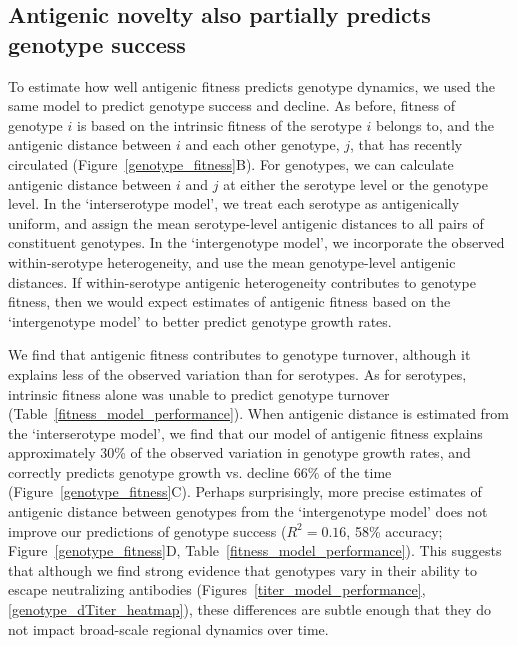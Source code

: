 \documentclass[11pt,oneside,letterpaper]{article}
\begin{document}
\subsection*{Antigenic novelty also partially predicts genotype success}
To estimate how well antigenic fitness predicts genotype dynamics, we used the same model to predict genotype success and decline.
As before, fitness of genotype $i$ is based on the intrinsic fitness of the serotype $i$ belongs to, and the antigenic distance between $i$ and each other genotype, $j$, that has recently circulated (Figure~\ref{genotype_fitness}B).
For genotypes, we can calculate antigenic distance between $i$ and $j$ at either the serotype level or the genotype level.
In the `interserotype model', we treat each serotype as antigenically uniform, and assign the mean serotype-level antigenic distances to all pairs of constituent genotypes.
In the `intergenotype model', we incorporate the observed within-serotype heterogeneity, and use the mean genotype-level antigenic distances.
If within-serotype antigenic heterogeneity contributes to genotype fitness, then we would expect estimates of antigenic fitness based on the `intergenotype model' to better predict genotype growth rates.

We find that antigenic fitness contributes to genotype turnover, although it explains less of the observed variation than for serotypes.
As for serotypes, intrinsic fitness alone was unable to predict genotype turnover (Table~\ref{fitness_model_performance}).
When antigenic distance is estimated from the `interserotype model', we find that our model of antigenic fitness explains approximately 30\% of the observed variation in genotype growth rates, and correctly predicts genotype growth vs. decline 66\% of the time (Figure~\ref{genotype_fitness}C).
Perhaps surprisingly, more precise estimates of antigenic distance between genotypes from the `intergenotype model' does not improve our predictions of genotype success ($R^2 = 0.16$, 58\% accuracy; Figure~\ref{genotype_fitness}D, Table~\ref{fitness_model_performance}).
This suggests that although we find strong evidence that genotypes vary in their ability to escape neutralizing antibodies (Figures~\ref{titer_model_performance}, \ref{genotype_dTiter_heatmap}), these differences are subtle enough that they do not impact broad-scale regional dynamics over time.
\end{document}
